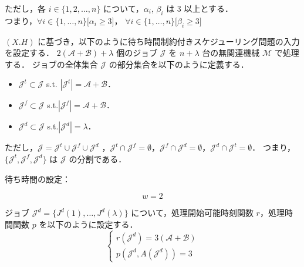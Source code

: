 \documentclass[12pt]{optlab-bachelor}
\begin{document}
ただし，各 $i \in \{1,2,\ldots, n\}$ について，$\alpha_i$, $\beta_i$ は 3 以上とする．\\
つまり，$\forall i \in \{1,\ldots,n\}\big[\alpha_i \ge 3\big]$，
$\forall i \in \{1,\ldots,n\}\big[\beta_i \ge 3\big]$

$(X.H)$ に基づき，以下のように待ち時間制約付きスケジューリング問題の入力を設定する．
$2(\mathcal{A} + \mathcal{B}) + \lambda$ 個のジョブ $\mathcal{J}$ を
$n + \lambda$ 台の無関連機械 $\mathcal{M}$ で処理する．
ジョブの全体集合 $\mathcal{J}$ の部分集合を以下のように定義する．
\begin{itemize}
  \item $\mathcal{J}^t \subset \mathcal{J}$ s.t. $|\mathcal{J}^t| =
  \mathcal{A}  + \mathcal{B}$．
  \item $\mathcal{J}^f \subset \mathcal{J}$
  s.t.$|\mathcal{J}^f| = \mathcal{A}  + \mathcal{B}$．
  \item $\mathcal{J}^d \subset \mathcal{J}$ s.t.$|\mathcal{J}^d| =
  \lambda$．
\end{itemize}
ただし，$\mathcal{J} = \mathcal{J}^t \cup \mathcal{J}^f \cup
\mathcal{J}^d$ ，$\mathcal{J}^t \cap \mathcal{J}^f = \emptyset$，$\mathcal{J}^f \cap \mathcal{J}^d = \emptyset$，$\mathcal{J}^d \cap \mathcal{J}^t = \emptyset$．
つまり，$\{\mathcal{J}^t, \mathcal{J}^f,\mathcal{J}^d\}$ は $\mathcal{J}$ の分割である．

\newpage
\begin{description}
  \item[待ち時間の設定：]
\end{description}
\begin{displaymath}
  w = 2
\end{displaymath}


ジョブ $\mathcal{J}^d = \{J^d(1),\ldots,J^d({\lambda})\}$ について，処理開始可能時刻関数 $r$，処理時間関数 $p$ を以下のように設定する．
\begin{displaymath}
  \left\{ \begin{array}{ll} r(\mathcal{J}^d) = 3(\mathcal{A} + \mathcal{B}) \\
  p(\mathcal{J}^d, A(\mathcal{J}^d)) = 3 \end{array} \right.
\end{displaymath}
\end{document}
